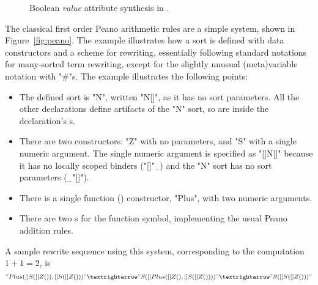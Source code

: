 \documentclass[letterpaper,11pt]{article}
\begin{document}
\begin{figure*}[p]
  \vspace*{-1em}
  \caption{Boolean \emph{value} attribute synthesis in \hax.}
  \label{fig:bool}
\end{figure*}

\begin{example}[Peano]\label{ex:peano}
  The classical first order Peano arithmetic rules are a simple \hax system, shown in
  Figure~\ref{fig:peano}.  The example illustrates how a sort is defined with data constructors and
  a scheme for rewriting, essentially following standard notations for many-sorted term rewriting,
  except for the slightly unusual (meta)variable notation with "#"s. The example illustrates the
  following points:
  \begin{itemize}

  \item The defined sort is "N", written "N[]", as it has no sort parameters. All the other
    declarations define artifacts of the "N" sort, so are inside the  declaration's
    \kw{\{\}}s.

  \item There are two  constructors: "Z" with no parameters, and "S" with a single numeric
    argument. The single numeric argument is specified as "[]N[]" because it has no locally scoped
    binders ("[]"$_-$) and the "N" sort has no sort parameters ($_-$"[]").

  \item There is a single function () constructor, "Plus", with two numeric arguments.

  \item There are two s for the function symbol, implementing the usual Peano addition rules.

  \end{itemize}
  A sample rewrite sequence using this system, corresponding to the computation $1+1=2$, is
  \begin{displaymath}
    "Plus([]S([]Z()), []S([]Z()))" →
    "S([]Plus([]Z(), []S([]Z())))" →
    "S([]S([]Z()))"
  \end{displaymath}
\end{example}
\end{document}
